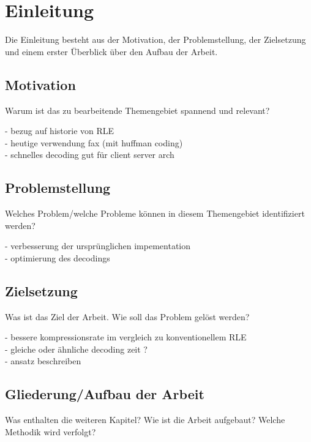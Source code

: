 
\chapter{Einleitung}
\label{ch:Einleitung}
Die Einleitung besteht aus der Motivation, der Problemstellung, der Zielsetzung und einem erster Überblick über den Aufbau der Arbeit.

\section{Motivation}
\label{ch:Einleitung:sec:Motivation}

Warum ist das zu bearbeitende Themengebiet spannend und relevant?

- bezug auf historie von RLE\\
- heutige verwendung fax (mit huffman coding)\\
- schnelles decoding gut für client server arch\\

\section{Problemstellung}
\label{ch:Einleitung:sec:Problemstellung}

Welches Problem/welche Probleme können in diesem Themengebiet identifiziert werden?

- verbesserung der ursprünglichen impementation\\
- optimierung des decodings\\

\section{Zielsetzung}
\label{ch:Einleitung:sec:Zielsetzung}

Was ist das Ziel der Arbeit. Wie soll das Problem gelöst werden?

- bessere kompressionsrate im vergleich zu konventionellem RLE\\
- gleiche oder ähnliche decoding zeit ?\\
- ansatz beschreiben\\


\section{Gliederung/Aufbau der Arbeit}
\label{ch:Einleitung:sec:Gliederung}

Was enthalten die weiteren Kapitel? Wie ist die Arbeit aufgebaut? Welche Methodik wird verfolgt?


